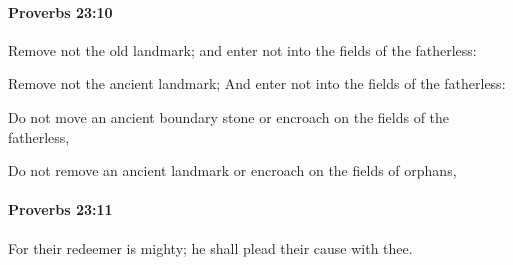 		\paragraph{Proverbs 23:10} %
			\label{PROVERBS-23-10}

			Remove not the old landmark; and enter not into the fields of the fatherless:

			\begin{versebox}
					\item[BHS] 
					\item[ASV] Remove not the ancient landmark; And enter not into the fields of the fatherless:
					\item[NIV] Do not move an ancient boundary stone or encroach on the fields of the fatherless,
					\item[NRSV] Do not remove an ancient landmark or encroach on the fields of orphans,
			\end{versebox}

		\paragraph{Proverbs 23:11} %
			\label{PROVERBS-23-11}

			For their redeemer is mighty; he shall plead their cause with thee.

